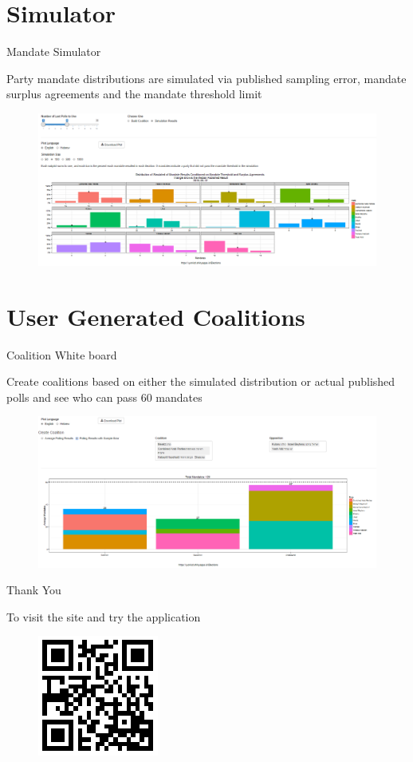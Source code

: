\documentclass[11pt]{beamer}
\begin{document}
\section{Simulator}
\begin{frame}{Mandate Simulator}
			\begin{block}{}
			Party mandate distributions are simulated via published sampling error, mandate surplus agreements and the mandate threshold limit
			\end{block}
\begin{figure}				
					\centering
					\includegraphics[width=1\linewidth]{../www/sim_screen_grab}
					\label{fig:sim_screen_grab}
				\end{figure}

\end{frame}


\section{User Generated Coalitions}
\begin{frame}{Coalition White board}
\begin{block}{}
Create coalitions based on either the simulated distribution or actual published polls and see who can pass 60 mandates
\end{block}
	\begin{figure}[h]
					\centering
					\includegraphics[width=1\linewidth]{../www/coal_screen_grab}
					\label{fig:coal_screen_grab}
	\end{figure}
\end{frame}

\begin{frame}
\centering
{\LARGE Thank You} \\

\vspace{2cm}

To visit the site and try the application

	\begin{figure}[h]
					\centering
					\includegraphics[width=.1\linewidth]{../www/PADqr}
					\label{fig:QR}
	\end{figure}
\end{frame}
\end{document}

